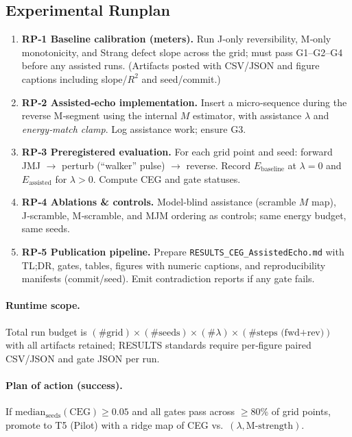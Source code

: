 \documentclass{article}
\begin{document}
\subsection{Experimental Runplan}

\begin{enumerate}[leftmargin=1.5em,itemsep=0.35em]
  \item \textbf{RP‑1 Baseline calibration (meters).} Run J‑only reversibility, M‑only monotonicity, and Strang defect slope across the grid; must pass G1–G2–G4 before any assisted runs. (Artifacts posted with CSV/JSON and figure captions including slope/$R^2$ and seed/commit.)
  \item \textbf{RP‑2 Assisted‑echo implementation.} Insert a micro‑sequence during the reverse M‑segment using the internal $M$ estimator, with assistance $\lambda$ and \emph{energy‑match clamp}. Log assistance work; ensure G3.
  \item \textbf{RP‑3 Preregistered evaluation.} For each grid point and seed: forward JMJ $\to$ perturb (“walker” pulse) $\to$ reverse. Record $E_{\text{baseline}}$ at $\lambda{=}0$ and $E_{\text{assisted}}$ for $\lambda{>}0$. Compute CEG and gate statuses.
  \item \textbf{RP‑4 Ablations \& controls.} Model‑blind assistance (scramble $M$ map), J‑scramble, M‑scramble, and MJM ordering as controls; same energy budget, same seeds.
  \item \textbf{RP‑5 Publication pipeline.} Prepare \texttt{RESULTS\_CEG\_AssistedEcho.md} with TL;DR, gates, tables, figures with numeric captions, and reproducibility manifests (commit/seed). Emit contradiction reports if any gate fails.
\end{enumerate}

\paragraph{Runtime scope.}
Total run budget is $(\#\text{grid})\times(\#\text{seeds})\times(\#\lambda)\times(\#\text{steps (fwd+rev)})$ with all artifacts retained; RESULTS standards require per‑figure paired CSV/JSON and gate JSON per run.

\paragraph{Plan of action (success).}
If $\mathrm{median}_{\text{seeds}}(\mathrm{CEG}) \ge 0.05$ and all gates pass across $\ge$80\% of grid points, promote to T5 (Pilot) with a ridge map of CEG vs.\ $(\lambda,\text{M‑strength})$.
\end{document}

